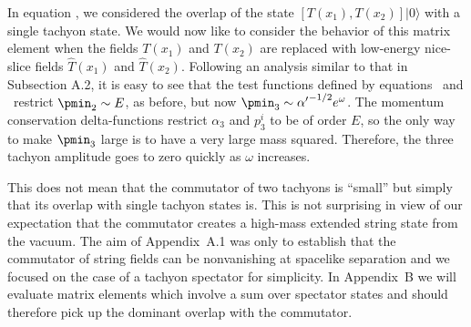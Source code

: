 
In equation \Mtach , we considered the overlap of the state
$[T(x_1),T(x_2)]|0\rangle$ with a single tachyon state.  We would now
like to consider the behavior of this matrix element when the fields
$T(x_1)$ and $T(x_2)$ are replaced with low-energy nice-slice fields
${\hat T}(x_1)$ and ${\hat T}(x_2)$.  Following an analysis similar
to that in Subsection A.2, it is easy to see that the test functions
defined by equations \lefdef\ and \lefdeftwo\
restrict $\pmin_2 \sim E$, as before, but now $\pmin_3 \sim
{\alpha'}^{-1/2} e^{\omega}$.  The momentum conservation
delta-functions restrict $\alpha_3$ and $p_3^i$ to be of order $E$,
so the only way to make $\pmin_3$ large is to have a very large mass
squared.  Therefore, the three tachyon amplitude goes to zero quickly
as $\omega$ increases.

This does not mean that the commutator of two tachyons is ``small''
but simply that its overlap with single tachyon states is.  This is
not surprising in view of our expectation that the commutator
creates a high-mass extended string state from the vacuum.
The aim of Appendix~A.1 was only to establish that the commutator
of string fields can be nonvanishing at spacelike separation and
we focused on the case of a tachyon spectator for simplicity.  In
Appendix~B we will evaluate matrix elements which involve a sum
over spectator states and should therefore pick up the dominant
overlap with the commutator.



